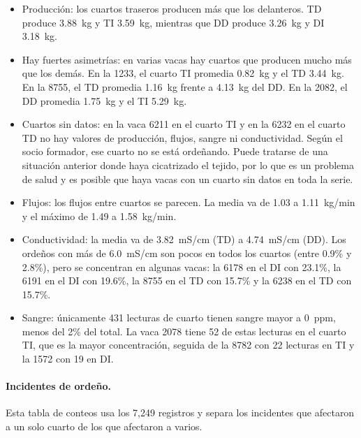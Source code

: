 \documentclass[11pt,letterpaper,DIV=12]{scrartcl}
\begin{document}
\begin{itemize}
  \item Producción: los cuartos traseros producen más que los delanteros. TD produce 3.88~kg y TI 3.59~kg, mientras que DD produce 3.26~kg y DI 3.18~kg.
  \item Hay fuertes asimetrías: en varias vacas hay cuartos que producen mucho más que los demás. En la 1233, el cuarto TI promedia 0.82~kg y el TD 3.44~kg. En la 8755, el TD promedia 1.16~kg frente a 4.13~kg del DD. En la 2082, el DD promedia 1.75~kg y el TI 5.29~kg.
  \item Cuartos sin datos: en la vaca 6211 en el cuarto TI y en la 6232 en el cuarto TD no hay valores de producción, flujos, sangre ni conductividad. Según el socio formador, ese cuarto no se está ordeñando. Puede tratarse de una situación anterior donde haya cicatrizado el tejido, por lo que es un problema de salud y es posible que haya vacas con un cuarto sin datos en toda la serie.
  \item Flujos: los flujos entre cuartos se parecen. La media va de 1.03 a 1.11~kg/min y el máximo de 1.49 a 1.58~kg/min.
  \item Conductividad: la media va de 3.82~mS/cm (TD) a 4.74~mS/cm (DD). Los ordeños con más de 6.0~mS/cm son pocos en todos los cuartos (entre 0.9\% y 2.8\%), pero se concentran en algunas vacas: la 6178 en el DI con 23.1\%, la 6191 en el DI con 19.6\%, la 8755 en el TD con 15.7\% y la 6238 en el TD con 15.7\%.
  \item Sangre: únicamente 431 lecturas de cuarto tienen sangre mayor a 0~ppm, menos del 2\% del total. La vaca 2078 tiene 52 de estas lecturas en el cuarto TI, que es la mayor concentración, seguida de la 8782 con 22 lecturas en TI y la 1572 con 19 en DI.
\end{itemize}

\paragraph{Incidentes de ordeño.} Esta tabla de conteos usa los 7,249 registros y separa los incidentes que afectaron a un solo cuarto de los que afectaron a varios.
\end{document}
